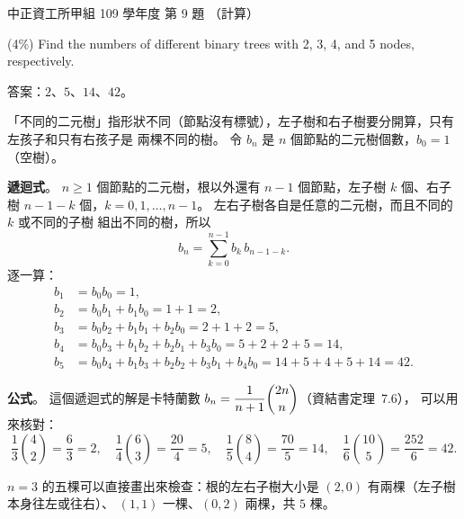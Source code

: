 \begin{pastexam}[label={px:ccu-109-swa-04}]{中正資工所甲組 109 學年度 第 9 題}
（計算）

(4\%) Find the numbers of different binary trees with 2, 3, 4, and 5 nodes, respectively.
\end{pastexam}

\begin{pastsoln}
答案：$2$、$5$、$14$、$42$。

「不同的二元樹」指形狀不同（節點沒有標號），左子樹和右子樹要分開算，只有左孩子和只有右孩子是
兩棵不同的樹。 令 $b_n$ 是 $n$ 個節點的二元樹個數，$b_0 = 1$（空樹）。

\textbf{遞迴式}。 $n \ge 1$ 個節點的二元樹，根以外還有 $n - 1$ 個節點，左子樹 $k$ 個、右子樹
$n - 1 - k$ 個，$k = 0, 1, \ldots, n - 1$。 左右子樹各自是任意的二元樹，而且不同的 $k$ 或不同的子樹
組出不同的樹，所以
\[
b_n = \sum_{k=0}^{n-1} b_k\, b_{n-1-k}.
\]
逐一算：
\begin{align*}
b_1 &= b_0 b_0 = 1,\\
b_2 &= b_0 b_1 + b_1 b_0 = 1 + 1 = 2,\\
b_3 &= b_0 b_2 + b_1 b_1 + b_2 b_0 = 2 + 1 + 2 = 5,\\
b_4 &= b_0 b_3 + b_1 b_2 + b_2 b_1 + b_3 b_0 = 5 + 2 + 2 + 5 = 14,\\
b_5 &= b_0 b_4 + b_1 b_3 + b_2 b_2 + b_3 b_1 + b_4 b_0 = 14 + 5 + 4 + 5 + 14 = 42.
\end{align*}

\textbf{公式}。 這個遞迴式的解是卡特蘭數 $b_n = \dfrac{1}{n+1}\dbinom{2n}{n}$（資結書定理~7.6），
可以用來核對：
\[
\frac{1}{3}\binom{4}{2} = \frac{6}{3} = 2,\quad
\frac{1}{4}\binom{6}{3} = \frac{20}{4} = 5,\quad
\frac{1}{5}\binom{8}{4} = \frac{70}{5} = 14,\quad
\frac{1}{6}\binom{10}{5} = \frac{252}{6} = 42.
\]

$n = 3$ 的五棵可以直接畫出來檢查：根的左右子樹大小是 $(2, 0)$ 有兩棵（左子樹本身往左或往右）、
$(1, 1)$ 一棵、$(0, 2)$ 兩棵，共 $5$ 棵。
\end{pastsoln}
